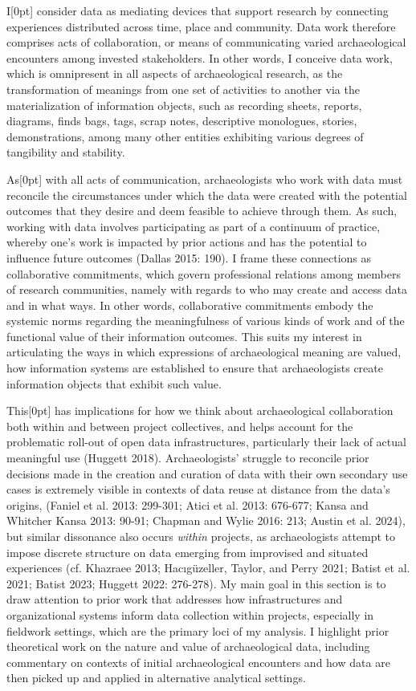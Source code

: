 \documentclass[
]{article}
\newcommand{\paragraphnumber}[1]{\marginnote{\color{lightgray}\tiny{#1}}[0pt]}
\begin{document}
I\paragraphnumber{[3]} consider data as mediating devices that support
research by connecting experiences distributed across time, place and
community. Data work therefore comprises acts of collaboration, or means
of communicating varied archaeological encounters among invested
stakeholders. In other words, I conceive data work, which is omnipresent
in all aspects of archaeological research, as the transformation of
meanings from one set of activities to another via the materialization
of information objects, such as recording sheets, reports, diagrams,
finds bags, tags, scrap notes, descriptive monologues, stories,
demonstrations, among many other entities exhibiting various degrees of
tangibility and stability.

As\paragraphnumber{[4]} with all acts of communication, archaeologists
who work with data must reconcile the circumstances under which the data
were created with the potential outcomes that they desire and deem
feasible to achieve through them. As such, working with data involves
participating as part of a continuum of practice, whereby one's work is
impacted by prior actions and has the potential to influence future
outcomes (Dallas 2015: 190). I frame these connections as collaborative
commitments, which govern professional relations among members of
research communities, namely with regards to who may create and access
data and in what ways. In other words, collaborative commitments embody
the systemic norms regarding the meaningfulness of various kinds of work
and of the functional value of their information outcomes. This suits my
interest in articulating the ways in which expressions of archaeological
meaning are valued, how information systems are established to ensure
that archaeologists create information objects that exhibit such value.

This\paragraphnumber{[5]} has implications for how we think about
archaeological collaboration both within and between project
collectives, and helps account for the problematic roll-out of open data
infrastructures, particularly their lack of actual meaningful use
(Huggett 2018). Archaeologists' struggle to reconcile prior decisions
made in the creation and curation of data with their own secondary use
cases is extremely visible in contexts of data reuse at distance from
the data's origins, (Faniel et al. 2013: 299-301; Atici et al. 2013:
676-677; Kansa and Whitcher Kansa 2013: 90-91; Chapman and Wylie 2016:
213; Austin et al. 2024), but similar dissonance also occurs
\emph{within} projects, as archaeologists attempt to impose discrete
structure on data emerging from improvised and situated experiences (cf.
Khazraee 2013; Hacıgüzeller, Taylor, and Perry 2021; Batist et al. 2021;
Batist 2023; Huggett 2022: 276-278). My main goal in this section is to
draw attention to prior work that addresses how infrastructures and
organizational systems inform data collection within projects,
especially in fieldwork settings, which are the primary loci of my
analysis. I highlight prior theoretical work on the nature and value of
archaeological data, including commentary on contexts of initial
archaeological encounters and how data are then picked up and applied in
alternative analytical settings.
\end{document}
